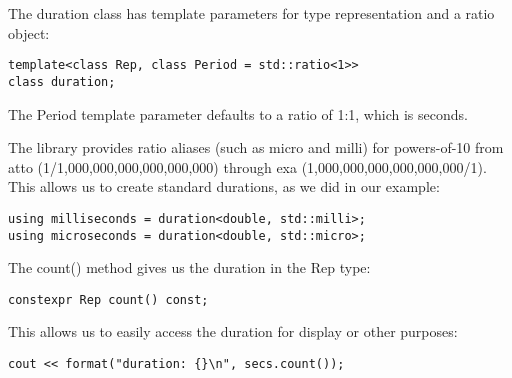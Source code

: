 The duration class has template parameters for type representation and a ratio object:

\begin{lstlisting}[style=styleCXX]
template<class Rep, class Period = std::ratio<1>>
class duration;
\end{lstlisting}

The Period template parameter defaults to a ratio of 1:1, which is seconds.

The library provides ratio aliases (such as micro and milli) for powers-of-10 from atto (1/1,000,000,000,000,000,000) through exa (1,000,000,000,000,000,000/1). This allows us to create standard durations, as we did in our example:

\begin{lstlisting}[style=styleCXX]
using milliseconds = duration<double, std::milli>;
using microseconds = duration<double, std::micro>;
\end{lstlisting}

The count() method gives us the duration in the Rep type:

\begin{lstlisting}[style=styleCXX]
constexpr Rep count() const;
\end{lstlisting}

This allows us to easily access the duration for display or other purposes:

\begin{lstlisting}[style=styleCXX]
cout << format("duration: {}\n", secs.count());
\end{lstlisting}
















